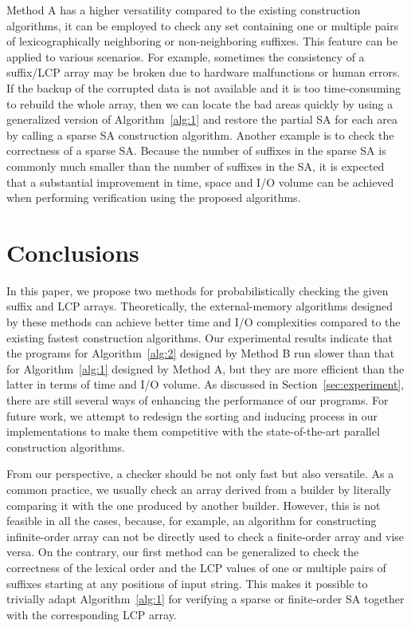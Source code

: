 \documentclass[10pt,journal,compsoc]{IEEEtran}
\begin{document}
Method A has a higher versatility compared to the existing construction algorithms, it can be employed to check any set containing one or multiple pairs of lexicographically neighboring or non-neighboring suffixes. This feature can be applied to various scenarios. For example, sometimes the consistency of a suffix/LCP array may be broken due to hardware malfunctions or human errors. If the backup of the corrupted data is not available and it is too time-consuming to rebuild the whole array, then we can locate the bad areas quickly by using a generalized version of Algorithm~\ref{alg:1} and restore the partial SA for each area by calling a sparse SA construction algorithm. Another example is to check the correctness of a sparse SA. Because the number of suffixes in the sparse SA is commonly much smaller than the number of suffixes in the SA, it is expected that a substantial improvement in time, space and I/O volume can be achieved when performing verification using the proposed algorithms.


\section{Conclusions} \label{sec:conclusion}

In this paper, we propose two methods for probabilistically checking the given suffix and LCP arrays. Theoretically, the external-memory algorithms designed by these methods can achieve better time and I/O complexities compared to the existing fastest construction algorithms. Our experimental results indicate that the programs for Algorithm~\ref{alg:2} designed by Method B run slower than that for Algorithm~\ref{alg:1} designed by Method A, but they are more efficient than the latter in terms of time and I/O volume. As discussed in Section~\ref{sec:experiment}, there are still several ways of enhancing the performance of our programs. For future work, we attempt to redesign the sorting and inducing process in our implementations to make them competitive with the state-of-the-art parallel construction algorithms. 

From our perspective, a checker should be not only fast but also versatile. As a common practice, we usually check an array derived from a builder by literally comparing it with the one produced by another builder. However, this is not feasible in all the cases, because, for example, an algorithm for constructing infinite-order array can not be directly used to check a finite-order array and vise versa. On the contrary, our first method can be generalized to check the correctness of the lexical order and the LCP values of one or multiple pairs of suffixes starting at any positions of input string. This makes it possible to trivially adapt Algorithm~\ref{alg:1} for verifying a sparse or finite-order SA together with the corresponding LCP array.
\end{document}
